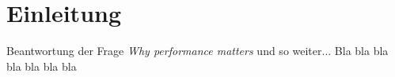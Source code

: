 \section{Einleitung}

Beantwortung der Frage \emph{Why performance matters} und so weiter...
Bla bla bla bla bla bla bla
